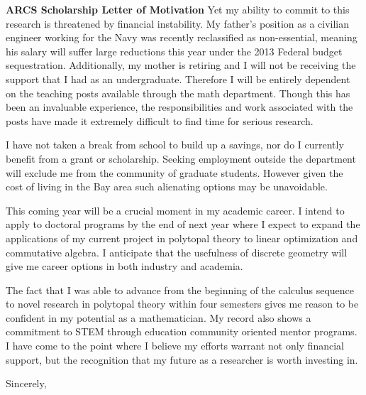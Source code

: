 \documentclass[11pt]{letter} %
\begin{document}
\begin{letter}{\bf ARCS Scholarship Letter of Motivation}
Yet my ability to commit to this research is threatened by financial instability. My father's position as a civilian engineer working for the Navy was recently reclassified as non-essential, meaning his salary will suffer large reductions this year under the 2013 Federal budget sequestration. Additionally, my mother is retiring and I will not be receiving the support that I had as an undergraduate. Therefore I will be entirely dependent on the teaching posts available through the math department. Though this has been an invaluable experience, the responsibilities and work associated with the posts have made it extremely difficult to find time for serious research. 

    I have not taken a break from school to build up a savings, nor do I currently benefit from a grant or scholarship. 
Seeking employment outside the department will exclude me from the community of graduate students. However given the cost of living in the Bay area such alienating options may be unavoidable.

This coming year will be a crucial moment in my academic career.   I intend to apply to doctoral programs by the end of next year where I expect to expand the applications of my current project in polytopal theory to linear optimization and commutative algebra.  I anticipate that the usefulness of discrete geometry will give me career options in both industry and academia. 

The fact that I was able to advance from the beginning of the calculus sequence to novel research in polytopal theory within four semesters gives me reason to be confident in my potential as a mathematician.  My record also shows a commitment to STEM through education community oriented mentor programs. I have come to the point where I believe my efforts warrant not only financial support, but the recognition that my future as a researcher is worth investing in. 







    \closing{Sincerely,}
   
 
 

\end{letter}
 
 
 \newpage
\end{document}
